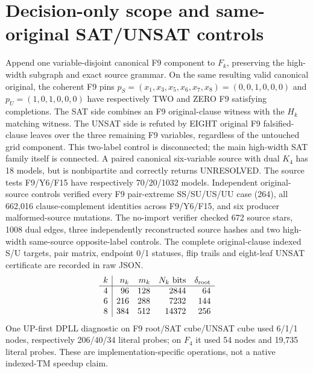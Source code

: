 \documentclass[11pt]{article}
\begin{document}
\section{Decision-only scope and same-original SAT/UNSAT controls}
Append one variable-disjoint canonical F9 component to $F_k$, preserving the high-width subgraph and exact source grammar. On the same resulting valid canonical original, the coherent F9 pins $p_S=(x_1,x_3,x_5,x_6,x_7,x_8)=(0,0,1,0,0,0)$ and $p_U=(1,0,1,0,0,0)$ have respectively TWO and ZERO F9 satisfying completions. The SAT side combines an F9 original-clause witness with the $H_k$ matching witness. The UNSAT side is refuted by EIGHT original F9 falsified-clause leaves over the three remaining F9 variables, regardless of the untouched grid component. This two-label control is disconnected; the main high-width SAT family itself is connected. A paired canonical six-variable source with dual $K_4$ has 18 models, but is nonbipartite and correctly returns UNRESOLVED.
The source tests F9/Y6/F15 have respectively 70/20/1032 models. Independent original-source controls verified every F9 pair-extreme SS/SU/US/UU case (264), all 662,016 clause-complement identities across F9/Y6/F15, and six producer malformed-source mutations. The no-import verifier checked 672 source stars, 1008 dual edges, three independently reconstructed source hashes and two high-width same-source opposite-label controls. The complete original-clause indexed S/U targets, pair matrix, endpoint 0/1 statuses, flip trails and eight-leaf UNSAT certificate are recorded in raw JSON.
\[
\begin{array}{c|rrrr}k&n_k&m_k&N_k\text{ bits}&\delta_{\rm root}\\ \hline
4&96&128&2844&64\\
6&216&288&7232&144\\
8&384&512&14372&256
\end{array}
\]
One UP-first DPLL diagnostic on F9 root/SAT cube/UNSAT cube used 6/1/1 nodes, respectively 206/40/34 literal probes; on $F_4$ it used 54 nodes and 19,735 literal probes. These are implementation-specific operations, not a native indexed-TM speedup claim.
\end{document}
